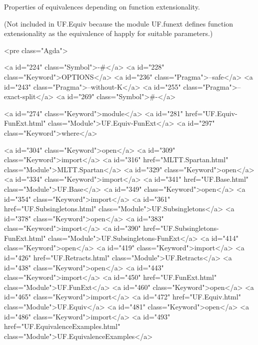 Properties of equivalences depending on function extensionality.

(Not included in UF.Equiv because the module UF.funext defines function
extensionality as the equivalence of happly for suitable parameters.)

<pre class="Agda">

<a id="224" class="Symbol">{-#</a> <a id="228" class="Keyword">OPTIONS</a> <a id="236" class="Pragma">--safe</a> <a id="243" class="Pragma">--without-K</a> <a id="255" class="Pragma">--exact-split</a> <a id="269" class="Symbol">#-}</a>

<a id="274" class="Keyword">module</a> <a id="281" href="UF.Equiv-FunExt.html" class="Module">UF.Equiv-FunExt</a> <a id="297" class="Keyword">where</a>

<a id="304" class="Keyword">open</a> <a id="309" class="Keyword">import</a> <a id="316" href="MLTT.Spartan.html" class="Module">MLTT.Spartan</a>
<a id="329" class="Keyword">open</a> <a id="334" class="Keyword">import</a> <a id="341" href="UF.Base.html" class="Module">UF.Base</a>
<a id="349" class="Keyword">open</a> <a id="354" class="Keyword">import</a> <a id="361" href="UF.Subsingletons.html" class="Module">UF.Subsingletons</a>
<a id="378" class="Keyword">open</a> <a id="383" class="Keyword">import</a> <a id="390" href="UF.Subsingletons-FunExt.html" class="Module">UF.Subsingletons-FunExt</a>
<a id="414" class="Keyword">open</a> <a id="419" class="Keyword">import</a> <a id="426" href="UF.Retracts.html" class="Module">UF.Retracts</a>
<a id="438" class="Keyword">open</a> <a id="443" class="Keyword">import</a> <a id="450" href="UF.FunExt.html" class="Module">UF.FunExt</a>
<a id="460" class="Keyword">open</a> <a id="465" class="Keyword">import</a> <a id="472" href="UF.Equiv.html" class="Module">UF.Equiv</a>
<a id="481" class="Keyword">open</a> <a id="486" class="Keyword">import</a> <a id="493" href="UF.EquivalenceExamples.html" class="Module">UF.EquivalenceExamples</a>

